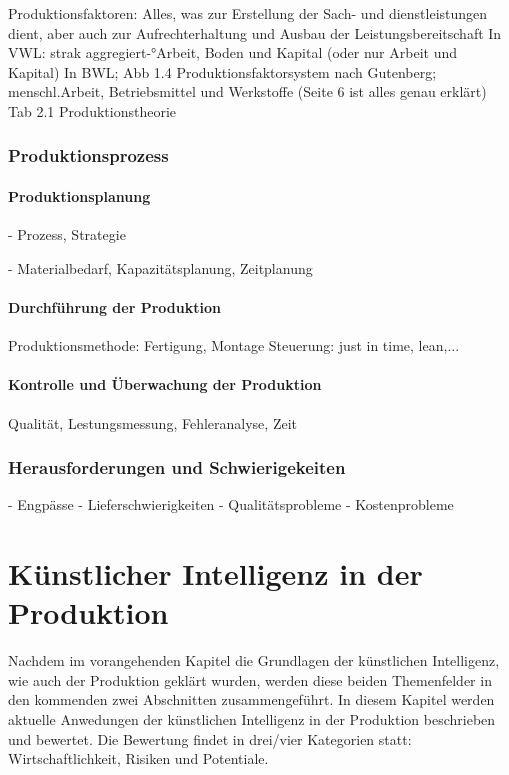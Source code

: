 \documentclass[a4paper,12pt, german]{report}
\begin{document}
Produktionsfaktoren: 
Alles, was zur Erstellung der Sach- und dienstleistungen dient, aber auch zur Aufrechterhaltung und Ausbau der Leistungsbereitschaft
In VWL: strak aggregiert-°Arbeit, Boden und Kapital (oder nur Arbeit und Kapital)
In BWL; Abb 1.4 Produktionsfaktorsystem nach Gutenberg; menschl.Arbeit, Betriebsmittel und Werkstoffe (Seite 6 ist alles genau erklärt)
Tab 2.1 Produktionstheorie

\subsection{Produktionsprozess}

\subsubsection{Produktionsplanung}
- Prozess, Strategie

- Materialbedarf, Kapazitätsplanung, Zeitplanung

\subsubsection{Durchführung der Produktion}
Produktionsmethode: Fertigung, Montage
Steuerung: just in time, lean,...

\subsubsection{Kontrolle und Überwachung der Produktion}
Qualität, Lestungsmessung, Fehleranalyse, Zeit
\subsection{Herausforderungen und Schwierigekeiten}

- Engpässe
- Lieferschwierigkeiten
- Qualitätsprobleme
- Kostenprobleme


\chapter{Künstlicher Intelligenz in der Produktion}

Nachdem im vorangehenden Kapitel die Grundlagen der künstlichen Intelligenz, wie auch der Produktion geklärt wurden, werden diese beiden Themenfelder in den kommenden zwei Abschnitten zusammengeführt. In diesem Kapitel werden aktuelle Anwedungen der künstlichen Intelligenz in der Produktion beschrieben und bewertet. Die Bewertung findet in drei/vier Kategorien statt: Wirtschaftlichkeit, Risiken und Potentiale.
\end{document}
